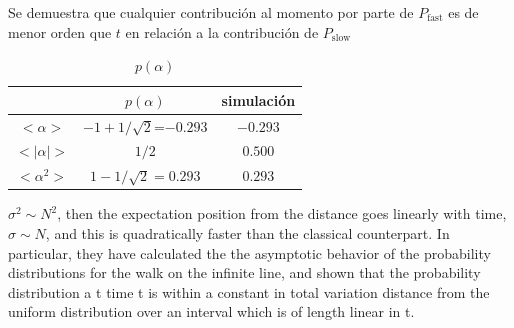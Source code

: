 \begin{appendix}
\begin{equation}
\end{equation}{}
Se demuestra que cualquier contribución al momento por parte de $P_{\mbox{fast}}$ es de menor orden que $t$ en relación a la contribución de $P_{\mbox{slow}}$
\begin{table}[ht]
    \centering
    \begin{tabular}{|c|c|c|}
    \hline    & $p(\alpha)$ & simulación \\\hline\hline
    $<\alpha>$& $-1+1/\sqrt{2}$=$-0.293$ & $-0.293$ \\\hline   
    $<|\alpha|>$ & $1/2$ & $0.500$ \\\hline
    $<\alpha^2>$ & $1-1/\sqrt{2} =0.293$ & $0.293$\\\hline
    \end{tabular}
    \caption{$p(\alpha)$}
    \label{Momentos}
\end{table}{}
$\sigma^2\sim N^2$, then the expectation position from the distance goes linearly with time, $\sigma\sim N$, and this is quadratically faster than the classical counterpart.
In particular, they have calculated the the asymptotic
behavior of the probability distributions for the walk on the infinite line, and shown that the probability distribution a t time t is within a constant in total variation distance from the uniform distribution over an interval which is of length linear in t.


\end{appendix}